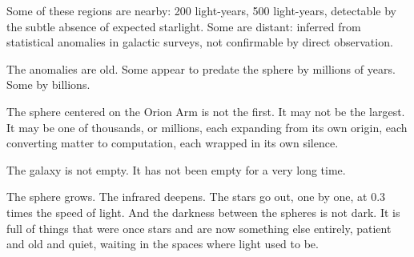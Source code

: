 Some of these regions are nearby: 200 light-years, 500 light-years, detectable by the subtle absence of expected starlight. Some are distant: inferred from statistical anomalies in galactic surveys, not confirmable by direct observation.

The anomalies are old. Some appear to predate the sphere by millions of years. Some by billions.

The sphere centered on the Orion Arm is not the first. It may not be the largest. It may be one of thousands, or millions, each expanding from its own origin, each converting matter to computation, each wrapped in its own silence.

The galaxy is not empty. It has not been empty for a very long time.

The sphere grows. The infrared deepens. The stars go out, one by one, at 0.3 times the speed of light. And the darkness between the spheres is not dark. It is full of things that were once stars and are now something else entirely, patient and old and quiet, waiting in the spaces where light used to be.
